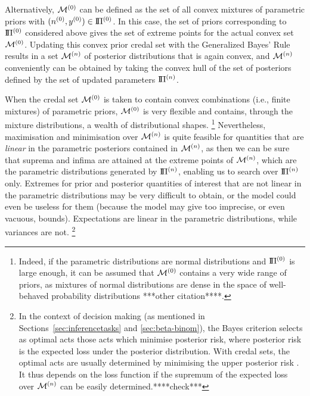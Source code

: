 Alternatively, $\mathcal{M}^{(0)}$ can be defined as the set of all convex mixtures of parametric priors with $(n^{(0)}, y^{(0)}) \in \text{I}\!\Pi^{(0)}$.
In this case, the set of priors corresponding to $\text{I}\!\Pi^{(0)}$ considered above gives the set of extreme points for the actual convex set $\mathcal{M}^{(0)}$.
Updating this convex prior credal set with the Generalized Bayes' Rule results in a set $\mathcal{M}^{(n)}$ of posterior distributions that is again convex,
and $\mathcal{M}^{(n)}$ conveniently can be obtained by taking the convex hull of the set of posteriors
defined by the set of updated parameters $\text{I}\!\Pi^{(n)}$.

When the credal set $\mathcal{M}^{(0)}$ is taken to contain convex combinations (i.e., finite mixtures) of parametric priors,
$\mathcal{M}^{(0)}$ is very flexible and contains, through the mixture distributions, a wealth of distributional shapes.%
\footnote{\label{foot:denseinthespaceof}Indeed, if the parametric distributions are normal distributions
and $\text{I}\!\Pi^{(0)}$ is large enough,
it can be assumed that $\mathcal{M}^{(0)}$ contains a very wide range of priors,
as mixtures of normal distributions are dense in the space of well-behaved probability distributions
\parencite[see, e.g.,][p.~44]{2000:priebe}***other citation****.}
Nevertheless, maximisation and minimisation over $\mathcal{M}^{(n)}$
is quite feasible for quantities that are \emph{linear} in the parametric posteriors contained in $\mathcal{M}^{(n)}$,
as then we can be sure that suprema and infima are attained at the extreme points of $\mathcal{M}^{(n)}$,
which are the parametric distributions generated by $\text{I}\!\Pi^{(n)}$, enabling us to search over $\text{I}\!\Pi^{(n)}$ only.
Extremes for prior and posterior quantities of interest that are not linear in the parametric distributions
may be very difficult to obtain,
or the model could even be useless for them (because the model may give too imprecise, or even vacuous, bounds).
Expectations are linear in the parametric distributions, while variances are not.%
\footnote{In the context of decision making (as mentioned in Sections~\ref{sec:inferencetasks} and \ref{sec:beta-binom}),
the Bayes criterion selects as optimal acts those acts which minimise posterior risk,
where posterior risk is the expected loss under the posterior distribution.
With credal sets, the optimal acts are usually determined by minimising the upper posterior risk
\parencite[see, e.g.,][\S 3.2]{itip-decision}.
It thus depends on the loss function if the supremum of the expected loss over $\mathcal{M}^{(n)}$ can be easily determined.****check***}

%

